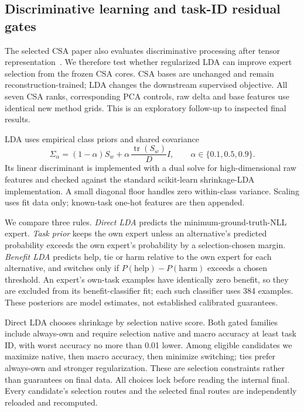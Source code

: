 \subsection{Discriminative learning and task-ID residual gates}
The selected CSA paper also evaluates discriminative processing after tensor representation~\cite{csa}. We therefore test whether regularized LDA can improve expert selection from the frozen CSA cores. CSA bases are unchanged and remain reconstruction-trained; LDA changes the downstream supervised objective. All seven CSA ranks, corresponding PCA controls, raw delta and base features use identical new method grids. This is an exploratory follow-up to inspected final results.

LDA uses empirical class priors and shared covariance
\[
 \Sigma_\alpha=(1-\alpha)S_w+\alpha\,\frac{\operatorname{tr}(S_w)}{D}I,
 \qquad \alpha\in\{0.1,0.5,0.9\}.
\]
Its linear discriminant is implemented with a dual solve for high-dimensional raw features and checked against the standard scikit-learn shrinkage-LDA implementation. A small diagonal floor handles zero within-class variance. Scaling uses fit data only; known-task one-hot features are then appended.

We compare three rules. \emph{Direct LDA} predicts the minimum-ground-truth-NLL expert. \emph{Task prior} keeps the own expert unless an alternative's predicted probability exceeds the own expert's probability by a selection-chosen margin. \emph{Benefit LDA} predicts help, tie or harm relative to the own expert for each alternative, and switches only if $P(\text{help})-P(\text{harm})$ exceeds a chosen threshold. An expert's own-task examples have identically zero benefit, so they are excluded from its benefit-classifier fit; each such classifier uses 384 examples. These posteriors are model estimates, not established calibrated guarantees.

Direct LDA chooses shrinkage by selection native score. Both gated families include always-own and require selection native and macro accuracy at least task ID, with worst accuracy no more than 0.01 lower. Among eligible candidates we maximize native, then macro accuracy, then minimize switching; ties prefer always-own and stronger regularization. These are selection constraints rather than guarantees on final data. All choices lock before reading the internal final. Every candidate's selection routes and the selected final routes are independently reloaded and recomputed.




